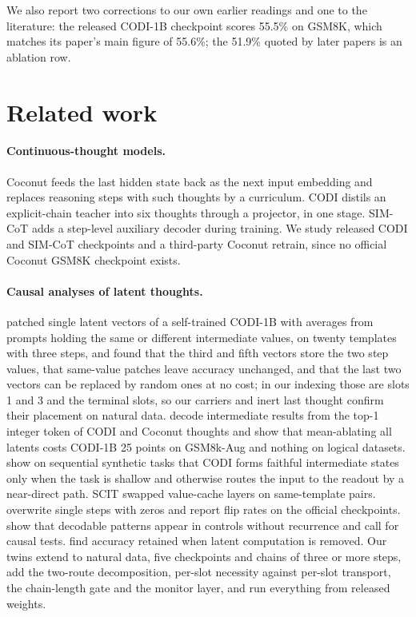 \documentclass{article}
\begin{document}
We also report two corrections to our own earlier readings and one to the literature: the released CODI-1B checkpoint scores 55.5\% on GSM8K, which matches its paper's main figure of 55.6\%; the 51.9\% quoted by later papers is an ablation row.

\section{Related work}

\paragraph{Continuous-thought models.} Coconut \citep{hao2024coconut} feeds the last hidden state back as the next input embedding and replaces reasoning steps with such thoughts by a curriculum. CODI \citep{shen2025codi} distils an explicit-chain teacher into six thoughts through a projector, in one stage. SIM-CoT \citep{wei2026simcot} adds a step-level auxiliary decoder during training. We study released CODI and SIM-CoT checkpoints and a third-party Coconut retrain, since no official Coconut GSM8K checkpoint exists.

\paragraph{Causal analyses of latent thoughts.} \citet{cywinski2025} patched single latent vectors of a self-trained CODI-1B with averages from prompts holding the same or different intermediate values, on twenty templates with three steps, and found that the third and fifth vectors store the two step values, that same-value patches leave accuracy unchanged, and that the last two vectors can be replaced by random ones at no cost; in our indexing those are slots 1 and 3 and the terminal slots, so our carriers and inert last thought confirm their placement on natural data. \citet{dilgren2026interpretable} decode intermediate results from the top-1 integer token of CODI and Coconut thoughts and show that mean-ablating all latents costs CODI-1B 25 points on GSM8k-Aug and nothing on logical datasets. \citet{liang2026stepbystep} show on sequential synthetic tasks that CODI forms faithful intermediate states only when the task is shallow and otherwise routes the input to the readout by a near-direct path. SCIT \citep{ding2026scit} swapped value-cache layers on same-template pairs. \citet{li2026dynamics} overwrite single steps with zeros and report flip rates on the official checkpoints. \citet{aswal2026observable} show that decodable patterns appear in controls without recurrence and call for causal tests. \citet{jin2026final} find accuracy retained when latent computation is removed. Our twins extend \citet{cywinski2025} to natural data, five checkpoints and chains of three or more steps, add the two-route decomposition, per-slot necessity against per-slot transport, the chain-length gate and the monitor layer, and run everything from released weights.
\end{document}
